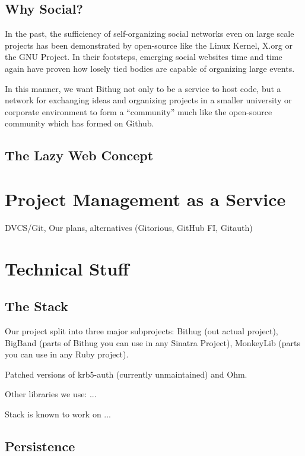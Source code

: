 \documentclass{llncs}
\begin{document}
\subsection{Why Social?}
In the past, the sufficiency of self-organizing social networks even on large 
scale projects has been demonstrated by open-source like the Linux 
Kernel\cite{kernel:www}, X.org\cite{xorg:www} or the GNU Project\cite{gnu:www}.
In their footsteps, emerging social websites time\cite{facebook:help} and 
time\cite{facebook:organize} again\cite{twitter:organize} have proven how losely
tied bodies are capable of organizing large events.

In this manner, we want Bithug not only to be a service to host code, but a 
network for exchanging ideas and organizing projects in a smaller university 
or corporate environment to form a ``community'' much like the open-source 
community which has formed on Github.
\subsection{The Lazy Web Concept}


\section{Project Management as a Service}

DVCS/Git, Our plans, alternatives (Gitorious, GitHub FI, Gitauth)

\section{Technical Stuff}

\subsection{The Stack}
Our project split into three major subprojects: Bithug (out actual project), BigBand (parts of Bithug you can use in any Sinatra Project), MonkeyLib (parts you can use in any Ruby project).

Patched versions of krb5-auth (currently unmaintained) and Ohm.

Other libraries we use: ...

Stack is known to work on ...

\subsection{Persistence}

\end{document}
